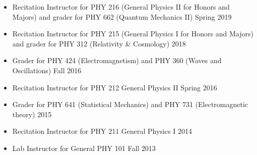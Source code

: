 
\begin{itemize}
 \item Recitation Instructor for PHY 216 (General Physics II for Honors and Majors) and grader for PHY 662 (Quantum Mechanics II)  \hfill Spring 2019 
 \item Recitation Instructor for PHY 215 (General Physics I for Honors and Majors) and grader for PHY 312 (Relativity \& Cosmology)   \hfill 2018 
 \item Grader for PHY 424 (Electromagnetism) and PHY 360 (Waves and Oscillations)  \hfill Fall 2016
 \item Recitation Instructor for PHY 212 General Physics II \hfill Spring 2016
 \item Grader for PHY 641 (Statistical Mechanics) and PHY 731 (Electromagnetic theory)  \hfill 2015 %
 \item Recitation Instructor for PHY 211 General Physics I \hfill 2014 %
 \item Lab Instructor for General PHY 101 \hfill Fall 2013
 \end{itemize}
